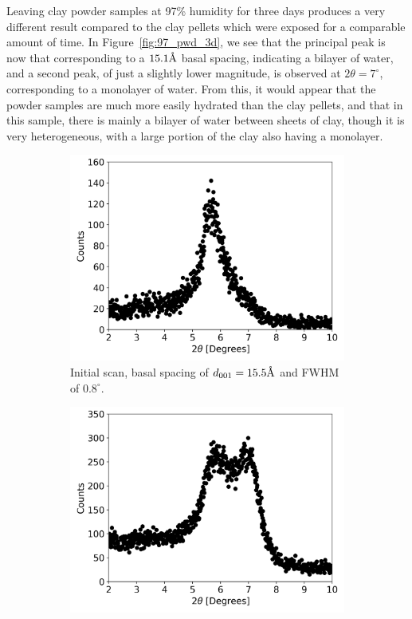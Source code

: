 Leaving clay powder samples at 97\% humidity for three days produces a very different result compared to the clay pellets which were exposed for a comparable amount of time. In Figure~\ref{fig:97_pwd_3d}, we see that the principal peak is now that corresponding to a $15.1\text{\normalfont\AA}$ basal spacing, indicating a bilayer of water, and a second peak, of just a slightly lower magnitude, is observed at $2\theta=7^\circ$, corresponding to a monolayer of water. From this, it would appear that the powder samples are much more easily hydrated than the clay pellets, and that in this sample, there is mainly a bilayer of water between sheets of clay, though it is very heterogeneous, with a large portion of the clay also having a monolayer.

\begin{figure}
	\centering
	\begin{subfigure}{.5\textwidth}
		\centering
		\includegraphics[scale=0.5]{images/97_pwd_5d.png}
		\caption{Initial scan, basal spacing of $d_{001}=15.5\text{\normalfont\AA}$ and FWHM of $0.8^\circ$.}
		\label{fig:97_pwd_5d}
	\end{subfigure}%
	\begin{subfigure}{.5\textwidth}
		\centering
		\includegraphics[scale=0.5]{images/97_pwd_5d_2.png}

\end{subfigure}
\end{figure}
